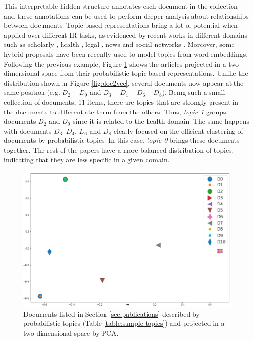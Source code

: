 This interpretable hidden structure annotates each document in the collection and these annotations can be used to perform deeper analysis about relationships between documents. Topic-based representations bring a lot of potential when applied over different IR tasks, as evidenced by recent works in different domains such as scholarly  \citep{Gatti2015}, health \citep{Lu2016, TapiNzali2017}, legal \citep{ONeill2017, Greene2016}, news \citep{He2017} and social networks \citep{Cheng2014a}. Moreover, some hybrid proposals have been recently used to model topics from word embeddings\citep{Dieng2020TopicMI}. Following the previous example, Figure \ref{fig:doctopics} shows the articles projected in a two-dimensional space from their probabilistic topic-based representations. Unlike the distribution shown in Figure \ref{fig:doc2vec}, several documents now appear at the same position (e.g. $D_2-D_9$ and $D_3-D_4-D_6-D_8$). Being such a small collection of documents, 11 items, there are topics that are strongly present in the documents to differentiate them from the others. Thus, \textit{topic 1} groups documents $D_2$ and $D_9$ since it is related to the health domain. The same happens with documents $D_3$, $D_4$, $D_6$ and $D_8$ clearly focused on the efficient clustering of documents by probabilistic topics. In this case, \textit{topic 0} brings these documents together. The rest of the papers have a more balanced distribution of topics, indicating that they are less specific in a given domain.

\begin{figure}[!htbp]
\centering
\includegraphics[scale=0.34]{doctopics.png}
\caption{Documents listed in Section \ref{sec:publications} described by probabilistic topics (Table \ref{table:sample-topics}) and projected in a two-dimensional space by PCA. }
\label{fig:doctopics}
\end{figure}


